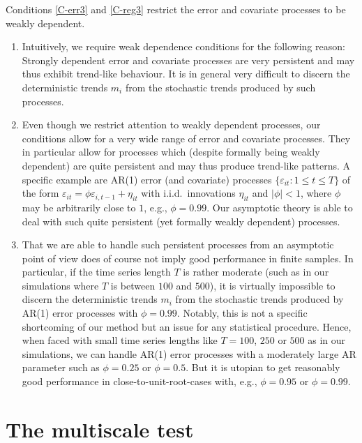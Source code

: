 \documentclass[12pt]{article}
\begin{document}
\begin{remark}
Conditions \ref{C-err3} and \ref{C-reg3} restrict the error and covariate processes to be weakly dependent.
\begin{enumerate}[label=(\roman*),leftmargin=0.9cm, itemsep=0pt, parsep=0pt, topsep=3pt]
\item Intuitively, we require weak dependence conditions for the following reason: Strongly dependent error and covariate processes are very persistent and may thus exhibit trend-like behaviour. It is in general very difficult to discern the deterministic trends $m_i$ from the stochastic trends produced by such processes.
\item Even though we restrict attention to weakly dependent processes, our conditions allow for a very wide range of error and covariate processes. They in particular allow for processes which (despite formally being weakly dependent) are quite persistent and may thus produce trend-like patterns. A specific example are AR(1) error (and covariate) processes $\{\varepsilon_{it}: 1 \le t \le T\}$ of the form $\varepsilon_{it} = \phi \varepsilon_{i,t-1} + \eta_{it}$ with i.i.d.\ innovations $\eta_{it}$ and $|\phi| < 1$, where $\phi$ may be arbitrarily close to $1$, e.g., $\phi = 0.99$. Our asymptotic theory is able to deal with such quite persistent (yet formally weakly dependent) processes.
\item That we are able to handle such persistent processes from an asymptotic point of view does of course not imply good performance in finite samples. In particular, if the time series length $T$ is rather moderate (such as in our simulations where $T$ is between $100$ and $500$), it is virtually impossible to discern the deterministic trends $m_i$ from the stochastic trends produced by AR(1) error processes with $\phi=0.99$. Notably, this is not a specific shortcoming of our method but an issue for any statistical procedure. Hence, when faced with small time series lengths like $T=100$, $250$ or $500$ as in our simulations, we can handle AR(1) error processes with a moderately large AR parameter such as $\phi=0.25$ or $\phi= 0.5$. But it is utopian to get reasonably good performance in close-to-unit-root-cases with, e.g., $\phi=0.95$ or $\phi=0.99$.  
\end{enumerate}
\end{remark}
  


\section{The multiscale test}\label{sec:test}
\end{document}
